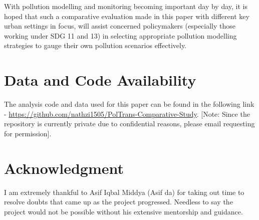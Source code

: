\documentclass[10pt,journal]{IEEEtran}
\begin{document}
With pollution modelling and monitoring becoming important day by day, it is hoped that such a comparative evaluation made in this paper with different key urban settings in focus, will assist concerned policymakers (especially those working under SDG 11 and 13) in selecting appropriate pollution modelling strategies to gauge their own pollution scenarios effectively.

\section*{Data and Code Availability}
The analysis code and data used for this paper can be found in the following link - \url{https://github.com/nathzi1505/PolTrans-Comparative-Study}. [Note: Since the repository is currently private due to confidential reasons, please email requesting for permission].

\section*{Acknowledgment}
I am extremely thankful to Asif Iqbal Middya (Asif da) for taking out time to resolve doubts that came up as the project progressed. Needless to say the project would not be possible without his extensive mentorship and guidance. 



\ifCLASSOPTIONcaptionsoff
\newpage
\fi



\end{document}
